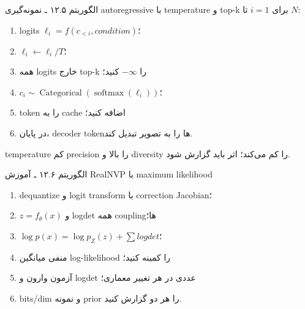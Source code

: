 \documentclass[12pt,openany,oneside]{book}
\newcommand{\softmax}{\operatorname{softmax}}
\begin{document}
\begin{algorithmbox}{الگوریتم ۱۲.۵ ـ نمونه‌گیری autoregressive با temperature و top-k}
برای $i=1$ تا $N$:
\begin{enumerate}
\item logits $\ell_i=f(c_{<i},condition)$؛
\item $\ell_i\leftarrow\ell_i/T$؛
\item همه logits خارج top-k را $-\infty$ کنید؛
\item $c_i\sim\operatorname{Categorical}(\softmax(\ell_i))$؛
\item token را به cache اضافه کنید؛
\item در پایان، decoder tokenها را به تصویر تبدیل کند.
\end{enumerate}
temperature کم precision را بالا و diversity را کم می‌کند؛ اثر باید گزارش شود.
\end{algorithmbox}

\begin{algorithmbox}{الگوریتم ۱۲.۶ ـ آموزش RealNVP با maximum likelihood}
\begin{enumerate}
\item dequantize و logit transform با correction Jacobian؛
\item $z=f_\theta(x)$ و logdet همه couplingها؛
\item $\log p(x)=\log p_Z(z)+\sum logdet$؛
\item منفی میانگین log-likelihood را کمینه کنید؛
\item آزمون وارون و logdet عددی در هر تغییر معماری؛
\item bits/dim و نمونه prior را هر دو گزارش کنید.
\end{enumerate}
\end{algorithmbox}
\end{document}
